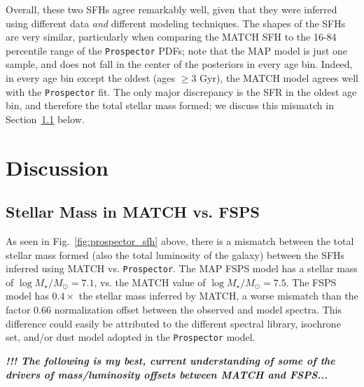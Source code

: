 \documentclass[preprint2]{aastex62}
\newcommand{\todo}[1]{\textbf{\textit{!!! #1}}}
\begin{document}
Overall, these two SFHs agree remarkably well, given that they were inferred using different data \textit{and} different modeling techniques. The shapes of the SFHs are very similar, particularly when comparing the MATCH SFH to the 16-84 percentile range of the \texttt{Prospector} PDFs; note that the MAP model is just one sample, and does not fall in the center of the posteriors in every age bin. Indeed, in every age bin except the oldest (ages $\geq 3$ Gyr), the MATCH model agrees well with the \texttt{Prospector} fit. The only major discrepancy is the SFR in the oldest age bin, and therefore the total stellar mass formed; we discuss this mismatch in Section~\ref{sec:mass_offset} below.


\section{Discussion}\label{sec:discussion}

\subsection{Stellar Mass in MATCH vs. FSPS}
\label{sec:mass_offset}

As seen in Fig.~\ref{fig:prospector_sfh} above, there is a mismatch between the total stellar mass formed (also the total luminosity of the galaxy) between the SFHs inferred using MATCH vs. \texttt{Prospector}. The MAP FSPS model has a stellar mass of $\log{M_\star/M_\odot} = 7.1$, vs. the MATCH value of $\log{M_\star/M_\odot} = 7.5$. The FSPS model has $0.4\times$ the stellar mass inferred by MATCH, a worse mismatch than the factor 0.66 normalization offset between the observed and model spectra. This difference could easily be attributed to the different spectral library, isochrone set, and/or dust model adopted in the \texttt{Prospector} model.

\todo{The following is my best, current understanding of some of the drivers of mass/luminosity offsets between MATCH and FSPS...}
\end{document}
